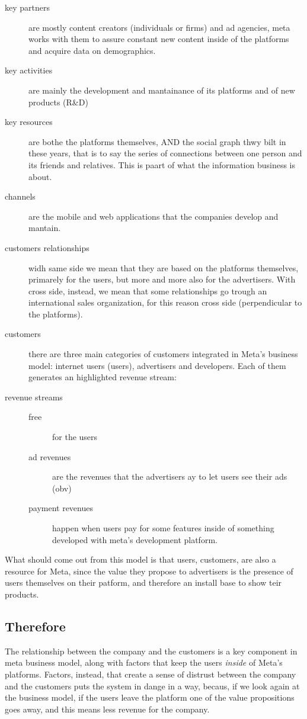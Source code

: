\documentclass[11pt]{article}
\begin{document}
\begin{description}
\item[{key partners}] are mostly content creators (individuals or
firms) and ad agencies, meta works with them to assure constant
new content inside of the platforms and acquire data on
demographics.
\item[{key activities}] are mainly the development and mantainance of
its platforms and of new products (R\&D)
\item[{key resources}] are bothe the platforms themselves, AND the
social graph thwy bilt in these years, that is to say the series
of connections between one person and its friends and
relatives. This is paart of what the information business is
about.
\item[{channels}] are the mobile and web applications that the
companies develop and mantain.
\item[{customers relationships}] widh same side we mean that they are
based on the platforms themselves, primarely for the users, but
more and more also for the advertisers. With cross side, instead,
we mean that some relationships go trough an international sales
organization, for this reason cross side (perpendicular to the
platforms).
\item[{customers}] there are three main categories of customers
integrated in Meta's business model: internet users (users),
advertisers and developers. Each of them generates an highlighted
revenue stream:
\item[{revenue streams}] \begin{description}
\item[{free}] for the users
\item[{ad revenues}] are the revenues that the advertisers ay to let
users see their ads (obv)
\item[{payment revenues}] happen when users pay for some features
inside of something developed with meta's development platform.
\end{description}
\end{description}

What should come out from this model is that users, customers, are
also a resource for Meta, since the value they propose to
advertisers is the presence of users themselves on their patform,
and therefore an install base to show teir products.
\subsection{Therefore}
\label{sec:orgf0dc75c}
The relationship between the company and the customers is a key
component in meta business model, along with factors that keep the
users \emph{inside} of Meta's platforms. Factors, instead, that create a
sense of distrust between the company and the customers puts the
system in dange in a way, becaus, if we look again at the business
model, if the users leave the platform one of the value
propositions goes away, and this means less revenue for the company.
\end{document}
